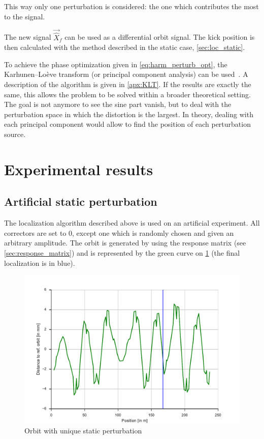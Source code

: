 This way only one perturbation is considered: the one which contributes the most to the signal.

The new signal $\vec{\hat{X}}_f$ can be used as a differential orbit signal. The kick position is then calculated with the method described in the static case, \cref{sec:loc_static}.

\remark To achieve the phase optimization given in \cref{eq:harm_perturb_opt}, the Karhunen–Loève transform (or principal component analysis) can be used~\cite{book:wang_2012}. A description of the algorithm is given in \cref{apx:KLT}. If the results are exactly the same, this allows the problem to be solved within a broader theoretical setting. The goal is not anymore to see the sine part vanish, but to deal with the perturbation space in which the distortion is the largest. In theory, dealing with each principal component would allow to find the position of each perturbation source.

\section{Experimental results}
\subsection{Artificial static perturbation}
The localization algorithm described above is used on an artificial experiment. All correctors are set to 0, except one which is randomly chosen and given an arbitrary amplitude. The orbit is generated by using the response matrix (see \cref{sec:response_matrix}) and is represented by the green curve on \cref{fig:loc_orbit} (the final localization is in blue).

\begin{figure}
    \centering
    \includegraphics[width=\linewidth]{img/loc_orbit}
    \caption{\label{fig:loc_orbit} Orbit with unique static perturbation}
\end{figure}

